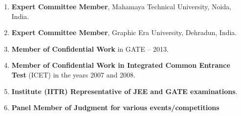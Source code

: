 \begin{enumerate}
\item
\textbf{Expert Committee Member}, Mahamaya Technical University, Noida, India.

\item 
\textbf{Expert Committee Member}, Graphic Era University, Dehradun, India.

\item
\textbf{Member of Confidential Work} in GATE – 2013. 

\item
\textbf{Member of Confidential Work in Integrated Common Entrance Test} (ICET) in the years 2007 and 2008.

\item
\textbf{Institute (IITR) Representative of JEE and GATE examinations}.

\item
\textbf{Panel Member of Judgment for various events/competitions}

\end{enumerate}





